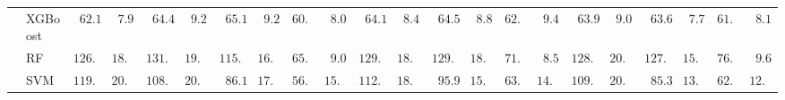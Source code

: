 \begin{tabular}{ll|ll|llllll|llllll|llllll}
 & XGBoost  & $\phantom{0}62.13$ & $\phantom{0}7.92$ & $\phantom{0}64.48$ & $\phantom{0}9.29$ & $\phantom{0}65.16$ & $\phantom{0}9.26$ & $60.70$ & $\phantom{0}8.03$ & $\phantom{0}64.10$ & $\phantom{0}8.41$ & $\phantom{0}64.53$ & $\phantom{0}8.87$ & $62.70$ & $\phantom{0}9.49$ & $\phantom{0}63.99$ & $\phantom{0}9.03$ & $\phantom{0}63.65$ & $\phantom{0}7.75$ & $61.81$ & $\phantom{0}8.13$ \\
 & RF  & $126.58$ & $18.92$ & $131.48$ & $19.00$ & $115.91$ & $16.03$ & $65.01$ & $\phantom{0}9.07$ & $129.72$ & $18.65$ & $129.29$ & $18.29$ & $71.50$ & $\phantom{0}8.58$ & $128.72$ & $20.24$ & $127.61$ & $15.45$ & $76.65$ & $\phantom{0}9.62$ \\
 & SVM  & $119.13$ & $20.32$ & $108.91$ & $20.46$ & $\phantom{0}86.15$ & $17.37$ & $56.81$ & $15.64$ & $112.76$ & $18.58$ & $\phantom{0}95.97$ & $15.63$ & $63.83$ & $14.76$ & $109.26$ & $20.71$ & $\phantom{0}85.38$ & $13.99$ & $62.11$ & $12.87$ \\
\hline 
\end{tabular}

